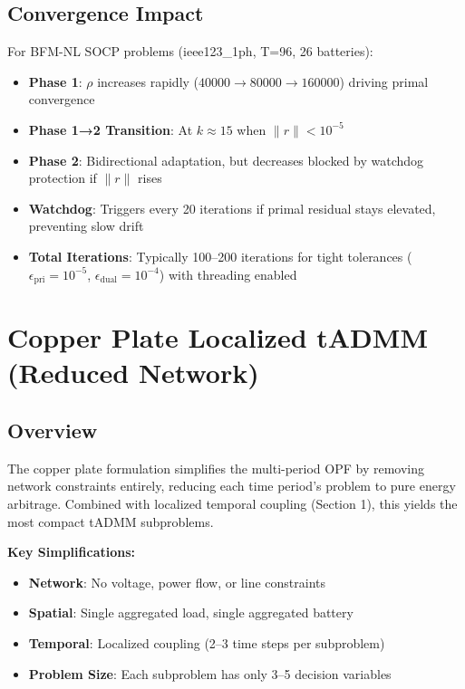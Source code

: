 \documentclass[11pt]{article}
\begin{document}
\subsection{Convergence Impact}

For BFM-NL SOCP problems (ieee123\_1ph, T=96, 26 batteries):
\begin{itemize}
    \item \textbf{Phase 1}: $\rho$ increases rapidly ($40000 \to 80000 \to 160000$) driving primal convergence
    \item \textbf{Phase 1→2 Transition}: At $k \approx 15$ when $\|r\| < 10^{-5}$
    \item \textbf{Phase 2}: Bidirectional adaptation, but decreases blocked by watchdog protection if $\|r\|$ rises
    \item \textbf{Watchdog}: Triggers every 20 iterations if primal residual stays elevated, preventing slow drift
    \item \textbf{Total Iterations}: Typically 100--200 iterations for tight tolerances ($\epsilon_{\text{pri}} = 10^{-5}$, $\epsilon_{\text{dual}} = 10^{-4}$) with threading enabled
\end{itemize}

\clearpage

\section{Copper Plate Localized tADMM (Reduced Network)}

\subsection{Overview}

The copper plate formulation simplifies the multi-period OPF by removing network constraints entirely, reducing each time period's problem to pure energy arbitrage. Combined with localized temporal coupling (Section 1), this yields the most compact tADMM subproblems.

\textbf{Key Simplifications:}
\begin{itemize}
    \item \textbf{Network}: No voltage, power flow, or line constraints
    \item \textbf{Spatial}: Single aggregated load, single aggregated battery
    \item \textbf{Temporal}: Localized coupling (2--3 time steps per subproblem)
    \item \textbf{Problem Size}: Each subproblem has only 3--5 decision variables
\end{itemize}
\end{document}
